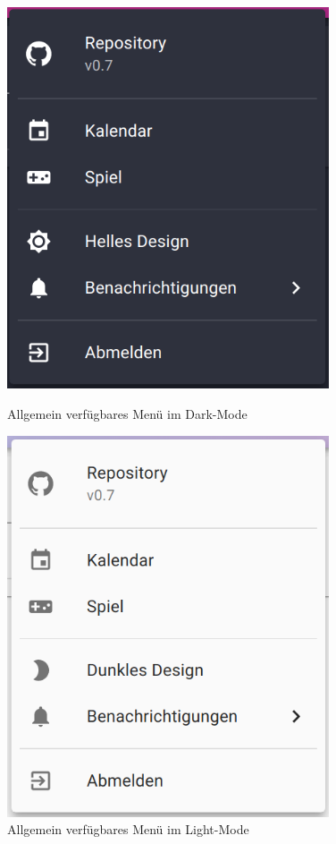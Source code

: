 \begin{figure}[h]
	\begin{minipage}{0.5\textwidth}
		\centering
		\includegraphics[width=0.85\textwidth]{images/menu.png}
		\caption{Allgemein verfügbares Menü im Dark-Mode}
		\label{fig:menu}
	\end{minipage}
	\begin{minipage}{0.5\textwidth}
		\centering
		\includegraphics[width=0.85\textwidth]{images/menu-light.png}
		\caption{Allgemein verfügbares Menü im Light-Mode}
		\label{fig:menu-light}
	\end{minipage}
\end{figure}

